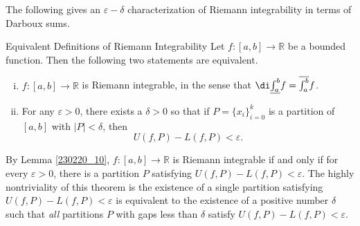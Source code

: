 The following gives an $\varepsilon-\delta$ characterization of Riemann integrability   in terms of Darboux sums.
\begin{theorem}[label=230221_2]{Equivalent Definitions of Riemann Integrability}
Let  $f:[a,b]\to\mathbb{R}$ be a bounded function. Then the following two statements are equivalent.
\begin{enumerate}[(i)]
\item $f:[a,b]\to\mathbb{R}$ is Riemann integrable, in the sense that $\di \underline{\int_a^b }f=\overline{\int_a^b} f$.
\item 
For any $\varepsilon>0$, there exists a $\delta>0$ so that   if $P=\{x_i\}_{i=0}^{k}$ is a partition of $[a,b]$ with $|P|<\delta$,  then
\[U(f,P)-L(f,P)<\varepsilon.\]
\end{enumerate}
 
 
\end{theorem}
 By Lemma  \ref{230220_10}, $f:[a,b]\to\mathbb{R}$ is Riemann integrable if and only if for every $\varepsilon>0$, there is a partition $P$ satisfying $U(f,P)-L(f,P)<\varepsilon$. The highly nontriviality of this theorem is   the existence of a single partition satisfying $U(f,P)-L(f,P)<\varepsilon$ is equivalent to the existence of a positive number $\delta$ such that \emph{all} partitions $P$ with gaps less than $\delta$   satisfy $U(f,P)-L(f,P)<\varepsilon$.

